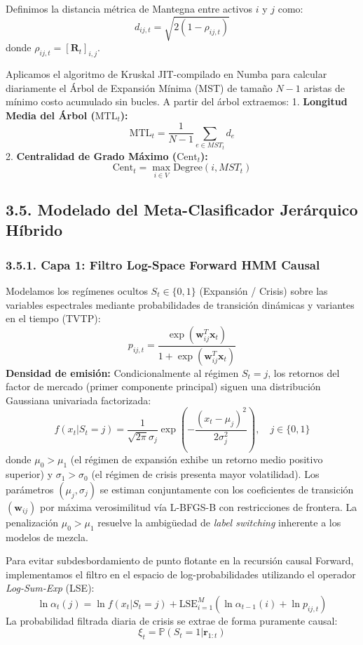 \documentclass[
  12pt,
]{article}
\begin{document}
Definimos la distancia métrica de Mantegna entre activos \(i\) y \(j\)
como: \[d_{ij,t} = \sqrt{2(1 - \rho_{ij,t})}\] donde
\(\rho_{ij,t} = [\mathbf{R}_t]_{i,j}\).

Aplicamos el algoritmo de Kruskal JIT-compilado en Numba para calcular
diariamente el Árbol de Expansión Mínima (MST) de tamaño \(N-1\) aristas
de mínimo costo acumulado sin bucles. A partir del árbol extraemos: 1.
\textbf{Longitud Media del Árbol (\(\text{MTL}_t\)):}
\[\text{MTL}_t = \frac{1}{N-1} \sum_{e \in MST_t} d_e\] 2.
\textbf{Centralidad de Grado Máximo (\(\text{Cent}_t\)):}
\[\text{Cent}_t = \max_{i \in V} \text{Degree}(i, MST_t)\]

\subsection{3.5. Modelado del Meta-Clasificador Jerárquico
Híbrido}\label{modelado-del-meta-clasificador-jeruxe1rquico-huxedbrido}

\subsubsection{3.5.1. Capa 1: Filtro Log-Space Forward HMM
Causal}\label{capa-1-filtro-log-space-forward-hmm-causal}

Modelamos los regímenes ocultos \(S_t \in \{0, 1\}\) (Expansión /
Crisis) sobre las variables espectrales mediante probabilidades de
transición dinámicas y variantes en el tiempo (TVTP):
\[p_{ij,t} = \frac{\exp(\mathbf{w}_{ij}^T \mathbf{x}_t)}{1 + \exp(\mathbf{w}_{ij}^T \mathbf{x}_t)}\]
\textbf{Densidad de emisión:} Condicionalmente al régimen \(S_t = j\), los retornos del factor de mercado (primer componente principal) siguen una distribución Gaussiana univariada factorizada:
\[f(x_t | S_t = j) = \frac{1}{\sqrt{2\pi}\sigma_j} \exp\left(-\frac{(x_t - \mu_j)^2}{2\sigma_j^2}\right), \quad j \in \{0, 1\}\]
donde \(\mu_0 > \mu_1\) (el régimen de expansión exhibe un retorno medio positivo superior) y \(\sigma_1 > \sigma_0\) (el régimen de crisis presenta mayor volatilidad). Los parámetros \((\mu_j, \sigma_j)\) se estiman conjuntamente con los coeficientes de transición \((\mathbf{w}_{ij})\) por máxima verosimilitud vía L-BFGS-B con restricciones de frontera. La penalización \(\mu_0 > \mu_1\) resuelve la ambigüedad de \emph{label switching} inherente a los modelos de mezcla.

Para evitar subdesbordamiento de punto flotante en la recursión causal
Forward, implementamos el filtro en el espacio de log-probabilidades
utilizando el operador \emph{Log-Sum-Exp} (LSE):
\[\ln \alpha_t(j) = \ln f(x_t | S_t = j) + \text{LSE}_{i=1}^M \left( \ln \alpha_{t-1}(i) + \ln p_{ij,t} \right)\]
La probabilidad filtrada diaria de crisis se extrae de forma puramente
causal: \[\xi_t = \mathbb{P}(S_t = 1 | \mathbf{r}_{1:t})\]
\end{document}

